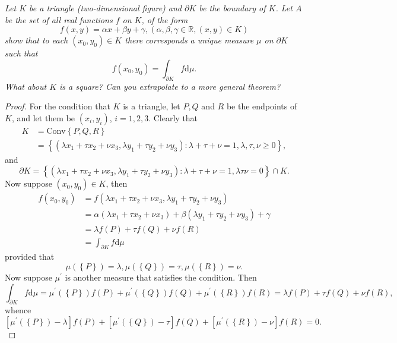 \begin{problem}\em
Let $K$ be a triangle (two-dimensional figure) and $\partial K$ be the boundary of $K$. Let $A$ be the set of all real functions $f$ on $K$, of the form 
$$
f\left( x,y \right) =\alpha x+\beta y+\gamma ,\left( \alpha ,\beta ,\gamma \in \mathbb{R} ,\left( x,y \right) \in K \right) 
$$
show that to each $(x_0,y_0)\in K$ there corresponds a unique measure $\mu$ on $\partial K$ such that 
$$
f\left( x_0,y_0 \right) =\int_{\partial K}{f\mathrm{d}\mu}.
$$
What about $K$ is a square? Can you extrapolate to a more general theorem?
\end{problem}
\begin{proof}
For the condition that $K$ is a triangle, let $P,Q$ and $R$ be the endpoints of $K$, and let them be $(x_i,y_i)$, $i=1,2,3$. Clearly that 
$$
\begin{aligned}
K&=\mathrm{Conv}\left\{ P,Q,R \right\} 
\\
&=\left\{ \left( \lambda x_1+\tau x_2+\nu x_3,\lambda y_1+\tau y_2+\nu y_3 \right) :\lambda +\tau +\nu =1,\lambda ,\tau ,\nu \ge 0 \right\} ,
\end{aligned}
$$
and 
$$
\partial K=\left\{ \left( \lambda x_1+\tau x_2+\nu x_3,\lambda y_1+\tau y_2+\nu y_3 \right) :\lambda +\tau +\nu =1,\lambda \tau \nu =0 \right\} \cap K.
$$
Now suppose $(x_0,y_0)\in K$, then 
$$
\begin{aligned}
f\left( x_0,y_0 \right) &=f\left( \lambda x_1+\tau x_2+\nu x_3,\lambda y_1+\tau y_2+\nu y_3 \right) 
\\
&=\alpha \left( \lambda x_1+\tau x_2+\nu x_3 \right) +\beta \left( \lambda y_1+\tau y_2+\nu y_3 \right) +\gamma 
\\
&=\lambda f\left( P \right) +\tau f\left( Q \right) +\nu f\left( R \right) 
\\
&=\int_{\partial K}{f\mathrm{d}\mu}
\end{aligned}
$$
provided that 
$$
\mu \left( \left\{ P \right\} \right) =\lambda ,\mu \left( \left\{ Q \right\} \right) =\tau ,\mu \left( \left\{ R \right\} \right) =\nu .
$$
Now suppose $\mu^\prime$ is another measure that satisfies the condition. Then 
$$
\int_{\partial K}{f\mathrm{d}\mu}=\mu ^{\prime}\left( \left\{ P \right\} \right) f\left( P \right) +\mu ^{\prime}\left( \left\{ Q \right\} \right) f\left( Q \right) +\mu ^{\prime}\left( \left\{ R \right\} \right) f\left( R \right) =\lambda f\left( P \right) +\tau f\left( Q \right) +\nu f\left( R \right) ,
$$
whence 
$$
\left[ \mu ^{\prime}\left( \left\{ P \right\} \right) -\lambda \right] f\left( P \right) +\left[ \mu ^{\prime}\left( \left\{ Q \right\} \right) -\tau \right] f\left( Q \right) +\left[ \mu ^{\prime}\left( \left\{ R \right\} \right) -\nu \right] f\left( R \right) =0.
$$
\end{proof}
